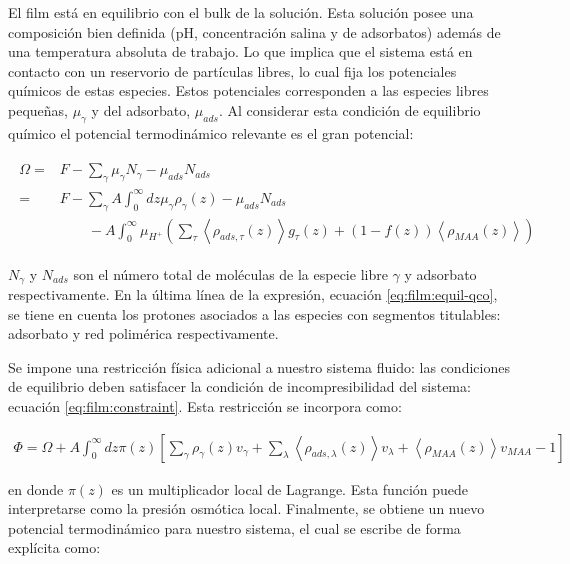 El film est\'a en equilibrio con el bulk de la soluci\'on. Esta soluci\'on posee una composici\'on bien definida (pH, concentraci\'on salina y de adsorbatos) adem\'as de una temperatura absoluta de trabajo. Lo que implica que el sistema est\'a en contacto con un reservorio de part\'iculas libres, lo cual fija los potenciales qu\'imicos de estas especies. Estos potenciales corresponden a las especies libres peque\~nas, $\mu_\gamma$ y del adsorbato, $\mu_{ads}$. Al considerar esta condici\'on de equilibrio qu\'imico el potencial termodin\'amico relevante es el gran potencial: 

\begin{align}
	\begin{aligned}
		\Omega = &F - \sum_\gamma \mu_\gamma N_\gamma -  \mu_{ads} N_{ads} \\
			= &F -\sum_\gamma A\int_0^\infty dz \mu_\gamma \rho_\gamma(z) -  \mu_{ads} N_{ads}  \\
			& \qquad -A\int_0^\infty \mu_{H^+} \left( \sum_\tau\left< \rho_{ads,\tau}(z) \right>g_\tau(z) + (1-f(z))\left< \rho_{MAA}(z) \right> \right )
			\end{aligned}
		\label{eq:film:equil-qco}
\end{align}

\noindent $N_\gamma$ y $ N_{ads}$ son el n\'umero total de mol\'eculas de la especie libre $\gamma$ y adsorbato respectivamente. En la \'ultima l\'inea de la expresi\'on, ecuaci\'on \ref{eq:film:equil-qco}, se tiene en cuenta los protones asociados a las especies con segmentos titulables: adsorbato y red polim\'erica respectivamente.


Se impone una restricci\'on f\'isica adicional a nuestro sistema fluido: las condiciones de equilibrio deben satisfacer la condici\'on de incompresibilidad del sistema: ecuaci\'on \ref{eq:film:constraint}.  Esta restricci\'on se incorpora como:

\begin{align}
	\Phi = \Omega +A \int_0^\infty dz\pi(z){\left[\sum_{\gamma}\rho_\gamma(z) v_\gamma + \sum_\lambda{\left<\rho_{ads,\lambda}(z)\right>v_\lambda} + \left<\rho_{MAA}(z)\right>v_{MAA} -1 \right]}
\end{align}


\noindent en donde $\pi(z)$ es un multiplicador local de Lagrange.  Esta funci\'on puede interpretarse como la presi\'on osm\'otica local. Finalmente, se obtiene un nuevo potencial termodin\'amico para nuestro sistema, el cual se escribe de forma expl\'icita como:
 
